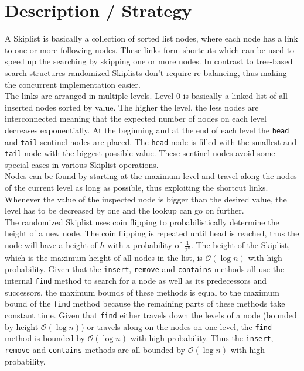
\section{Description / Strategy}

A Skiplist is basically a collection of sorted list nodes, where each node has a link to one or more following nodes. These links form shortcuts which can be used to speed up the searching by skipping one or more nodes. In contrast to tree-based search structures randomized Skiplists don't require re-balancing, thus making the concurrent implementation easier.\\

\noindent The links are arranged in multiple levels. Level $0$ is basically a linked-list of all inserted nodes sorted by value. The higher the level, the less nodes are interconnected meaning that the expected number of nodes on each level decreases exponentially. At the beginning and at the end of each level the \texttt{head} and \texttt{tail} sentinel nodes are placed. The \texttt{head} node is filled with the smallest and \texttt{tail} node with the biggest possible value. These sentinel nodes avoid some special cases in various Skiplist operations.\\

\noindent Nodes can be found by starting at the maximum level and travel along the nodes of the current level as long as possible, thus exploiting the shortcut links. Whenever the value of the inspected node is bigger than the desired value, the level has to be decreased by one and the lookup can go on further.\\

\noindent The randomized Skiplist uses coin flipping to probabilistically determine the height of a new node. The coin flipping is repeated until head is reached, thus the node will have a height of $h$ with a probability of $\frac{1}{2^h}$. The height of the Skiplist, which is the maximum height of all nodes in the list, is $\mathcal{O}(\log{n})$ with high probability. Given that the \texttt{insert}, \texttt{remove} and \texttt{contains} methods all use the internal \texttt{find} method to search for a node as well as its predecessors and successors, the maximum bounds of these methods is equal to the maximum bound of the \texttt{find} method because the remaining parts of these methods take constant time. Given that \texttt{find} either travels down the levels of a node (bounded by height $\mathcal{O}(\log{n})$) or travels along on the nodes on one level, the \texttt{find} method is bounded by $\mathcal{O}(\log{n})$ with high probability. Thus the \texttt{insert}, \texttt{remove} and \texttt{contains} methods are all bounded by $\mathcal{O}(\log{n})$ with high probability.

